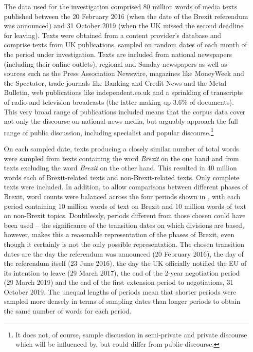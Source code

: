 \documentclass[output=paper]{langscibook}
\begin{document}
The data used for the investigation comprised 80 million words of media texts published between the 20 February 2016 (when the date of the Brexit referendum was announced) and 31 October 2019 (when the UK missed the second deadline for leaving). Texts were obtained from a content provider’s database and comprise texts from UK publications, sampled on random dates of each month of the period under investigation. Texts are included from national newspapers (including their online outlets), regional and Sunday newspapers as well as sources such as the Press Association Newswire, magazines like MoneyWeek and the Spectator, trade journals like Banking and Credit News and the Metal Bulletin, web publications like independent.co.uk and a sprinkling of transcripts of radio and television broadcasts (the latter making up 3.6\% of documents). This very broad range of publications included means that the corpus data cover not only the discourse on national news media, but arguably approach the full range of public discussion, including specialist and popular discourse.\footnote{It does not, of course, sample discussion in semi-private and private discourse which will be influenced by, but could differ from public discourse.}

On each sampled date, texts producing a closely similar number of total words were sampled from texts containing the word \textit{Brexit} on the one hand and from texts excluding the word \textit{Brexit} on the other hand. This resulted in 40 million words each of Brexit-related texts and non-Brexit-related texts. Only complete texts were included. In addition, to allow comparisons between different phases of Brexit, word counts were balanced across the four periods shown in , with each period containing 10 million words of text on Brexit and 10 million words of text on non-Brexit topics. Doubtlessly, periods different from those chosen could have been used -- the significance of the transition dates on which divisions are based, however, makes this a reasonable representation of the phases of Brexit, even though it certainly is not the only possible representation. The chosen transition dates are the day the referendum was announced (20 February 2016), the day of the referendum itself (23 June 2016), the day the UK officially notified the EU of its intention to leave (29 March 2017), the end of the 2-year negotiation period (29 March 2019) and the end of the first extension period to negotiations, 31 October 2019. The unequal lengths of periods mean that shorter periods were sampled more densely in terms of sampling dates than longer periods to obtain the same number of words for each period. 
\end{document}
